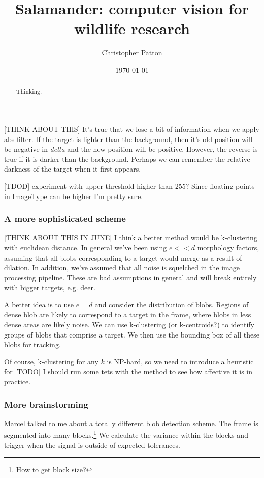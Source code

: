 \documentclass[letter]{article}
\author{Christopher Patton}
\date{\today}
\title{Salamander: computer vision for wildlife research}
\newcounter{foot}
\begin{document}
\maketitle

\begin{abstract}
Thinking.
\end{abstract}

\tableofcontents
\pagebreak 

[THINK ABOUT THIS] It's true that we lose a bit of information when we apply abs 
filter. If the target is lighter than the background, then it's old position will be 
negative in \textit{delta} and the new position will be positive. However, the reverse
is true if it is darker than the background. Perhaps we can remember the relative 
darkness of the target when it first appears. 

 
[TDOD] experiment with upper threshold higher than 255? Since floating points 
in ImageType can be higher I'm pretty sure. 

\subsubsection{A more sophisticated scheme}
[THINK ABOUT THIS IN JUNE] I think a better method would be k-clustering with euclidean 
distance. In general we've been using $e << d$ morphology factors, assuming that all 
blobs corresponding to a target would merge as a result of dilation. In addition, we've
assumed that all noise is squelched in the image processing pipeline. These are bad 
assumptions in general and will break entirely with bigger targets, e.g. deer. 

A better idea is to use $e = d$ and consider the distribution of blobs. Regions of dense
blob are likely to correspond to a target in the frame, where blobs in less dense areas 
are likely noise. We can use k-clustering (or k-centroids?) to identify groups of blobs
that comprise a target. We then use the bounding box of all these blobs for tracking. 

Of course, k-clustering for any $k$ is NP-hard, so we need to introduce a heuristic for
[TODO] I should run some tets with the method to see how affective it is in practice. 

\subsubsection{More brainstorming} 
Marcel talked to me about a totally different blob detection scheme. The frame is 
segmented into many blocks.\footnote{How to get block size?} We calculate the variance 
within the blocks and trigger when the signal is outside of expected tolerances. 
\end{document}
